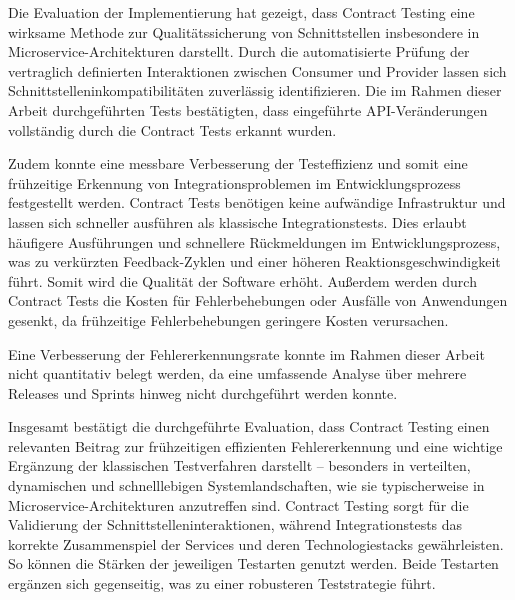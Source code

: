 Die Evaluation der Implementierung hat gezeigt, dass Contract Testing eine wirksame Methode zur Qualitätssicherung von Schnittstellen insbesondere in Microservice-Architekturen darstellt.
Durch die automatisierte Prüfung der vertraglich definierten Interaktionen zwischen Consumer und Provider lassen sich Schnittstelleninkompatibilitäten zuverlässig identifizieren.
Die im Rahmen dieser Arbeit durchgeführten Tests bestätigten, dass eingeführte \gls{API}-Veränderungen vollständig durch die Contract Tests erkannt wurden.

Zudem konnte eine messbare Verbesserung der Testeffizienz und somit eine frühzeitige Erkennung von Integrationsproblemen im Entwicklungsprozess festgestellt werden.
Contract Tests benötigen keine aufwändige Infrastruktur und lassen sich schneller ausführen als klassische Integrationstests.
Dies erlaubt häufigere Ausführungen und schnellere Rückmeldungen im Entwicklungsprozess, was zu verkürzten Feedback-Zyklen und einer höheren Reaktionsgeschwindigkeit führt.
Somit wird die Qualität der Software erhöht.
Außerdem werden durch Contract Tests die Kosten für Fehlerbehebungen oder Ausfälle von Anwendungen gesenkt, da frühzeitige Fehlerbehebungen geringere Kosten verursachen.

Eine Verbesserung der Fehlererkennungsrate konnte im Rahmen dieser Arbeit nicht quantitativ belegt werden, da eine umfassende Analyse über mehrere Releases und Sprints hinweg nicht durchgeführt werden konnte.

Insgesamt bestätigt die durchgeführte Evaluation, dass Contract Testing einen relevanten Beitrag zur frühzeitigen effizienten Fehlererkennung und eine wichtige Ergänzung der klassischen Testverfahren darstellt – besonders in verteilten, dynamischen und schnelllebigen Systemlandschaften, wie sie typischerweise in Microservice-Architekturen anzutreffen sind.
Contract Testing sorgt für die Validierung der Schnittstelleninteraktionen, während Integrationstests das korrekte Zusammenspiel der Services und deren Technologiestacks gewährleisten.
So können die Stärken der jeweiligen Testarten genutzt werden.
Beide Testarten ergänzen sich gegenseitig, was zu einer robusteren Teststrategie führt.

